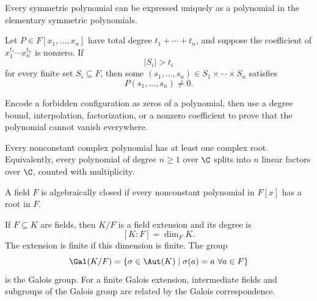     \begin{theorem}
        Every symmetric polynomial can be expressed uniquely as a polynomial in
        the elementary symmetric polynomials.
    \end{theorem}

    \begin{theorem}
        Let $P\in F[x_1,\dots,x_n]$ have total degree
        $t_1+\cdots+t_n$, and suppose the coefficient of
        $x_1^{t_1}\cdots x_n^{t_n}$ is nonzero. If
        \[
            |S_i|>t_i
        \]
        for every finite set $S_i\subseteq F$, then some
        $(s_1,\dots,s_n)\in S_1\times\cdots\times S_n$ satisfies
        \[
            P(s_1,\dots,s_n)\neq0.
        \]
    \end{theorem}

    \begin{strategy}
        Encode a forbidden configuration as zeros of a polynomial, then use a
        degree bound, interpolation, factorization, or a nonzero coefficient to
        prove that the polynomial cannot vanish everywhere.
    \end{strategy}

    \begin{theorem}
        Every nonconstant complex polynomial has at least one complex root.
        Equivalently, every polynomial of degree $n\geq 1$ over $\C$ splits into
        $n$ linear factors over $\C$, counted with multiplicity.
    \end{theorem}

    \begin{definition}
        A field $F$ is algebraically closed if every nonconstant polynomial in
        $F[x]$ has a root in $F$.
    \end{definition}

    \begin{definition}
        If $F\subseteq K$ are fields, then $K/F$ is a field extension and its
        degree is
        \[
            [K:F]=\dim_F K.
        \]
        The extension is finite if this dimension is finite. The group
        \[
            \Gal(K/F)
            =
            \{\sigma\in\Aut(K)\mid \sigma(a)=a\ \forall a\in F\}
        \]
        is the Galois group. For a finite Galois extension, intermediate fields
        and subgroups of the Galois group are related by the Galois
        correspondence.
    \end{definition}

